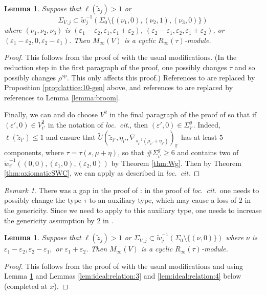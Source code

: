\documentclass[oneside,a4paper,english, 11pt]{amsart}
\theoremstyle{plain}
\theoremstyle{plain}
\theoremstyle{plain}
\newtheorem{lemma}[thm]{Lemma}
\theoremstyle{plain}
\theoremstyle{plain}
\theoremstyle{plain}
\theoremstyle{definition}
\theoremstyle{definition}
\theoremstyle{definition}
\theoremstyle{remark}
\newtheorem{rmk}[thm]{Remark}
\numberwithin{equation}{section}
\newcommand{\F}{\mathbb{F}}
\newcommand{\eps}{\varepsilon}
\newcommand{\speci}{\mathrm{sp}}
\newcommand{\tld}[1]{\widetilde{#1}}
\newcommand{\rhobar}{\overline{\rho}}
\begin{document}
\begin{lemma} \label{lemma:6weight}
Suppose that $\ell(\widetilde{z}_j) > 1$ or 
\[\Sigma_{V,j} \subset \tld{w}_j^{-1} (\Sigma_0 \setminus \{(\nu_1,0),(\nu_2,1),(\nu_3,0)\})\]
where $(\nu_1,\nu_2,\nu_3)$ is $(\eps_1-\eps_2,\eps_1, \eps_1+\eps_2)$, $(\eps_2-\eps_1, \eps_2, \eps_1+\eps_2)$, or $(\eps_1-\eps_2,0,\eps_2-\eps_1)$.
Then $M_\infty(V)$ is a cyclic $R_\infty(\tau)$-module.
\end{lemma}
\begin{proof}
This follows from the proof of \cite[Lemma 5.1.5]{LLLM2} with the usual modifications. 
(In the reduction step in the first paragraph of the proof, one possibly changes $\tau$ and so possibly changes $\rhobar^{\speci}$. This only affects this proof.) 
References to \cite[Theorem 4.1.9]{LLLM2} are replaced by Proposition \ref{prop:lattice:10-gen} above, and references to \cite[Lemma 5.1.4]{LLLM2} are replaced by references to Lemma \ref{lemma:broom}. 

Finally, we can and do choose $V^2$ in the final paragraph of the proof of \cite[Lemma 5.1.5]{LLLM2} so that if $(\eps',0) \in V^2_{i'}$ in the notation of \emph{loc.~cit}., then $(\eps',0) \in \Sigma^g_{i'}$. 
Indeed, $\ell(\tld{z}_{i'}) \leq 1$ and \cite[\S 8]{LLLM} ensure that $\tld{U}(\tld{z}_{i'}, \eta_{i'},\nabla_{s_{i'}^{-1}(\mu_{i'}+\eta_{i'})})_{\F}$ has at least $5$ components, where $\tau = \tau(s,\mu+\eta)$, so that $\# \Sigma^g_{i'} \geq 6$ and contains two of $\tld{w}_{i'}^{-1}((0,0),(\eps_1,0),(\eps_2,0))$ by Theorem \ref{thm:Wg}. 
Then by Theorem \ref{thm:axiomaticSWC}, we can apply \cite[Lemma 10.1.13]{EGS} as described in \emph{loc.~cit}. 
\end{proof}

\begin{rmk} There was a gap in the proof of \cite[Lemma 5.1.5]{LLLM2}: in the proof of \emph{loc.~cit}.~one needs to possibly change the type $\tau$ to an auxiliary type, which may cause a loss of $2$ in the genericity. Since we need to apply \cite[Theorem 4.1.9]{LLLM2} to this auxiliary type, one needs to increase the genericity assumption by $2$ in \cite[Theorem 5.1.1]{LLLM2}.
\end{rmk}
\begin{lemma}\label{lemma:8weight}
Suppose that $\ell(\widetilde{z}_j) > 1$ or $\Sigma_{V,j} \subset \tld{w}_j^{-1} (\Sigma_0 \setminus \{(\nu,0)\})$ where $\nu$ is $\eps_1-\eps_2,\eps_2-\eps_1,$ or $\eps_1+\eps_2$.
Then $M_\infty(V)$ is a cyclic $R_\infty(\tau)$-module.
\end{lemma}
\begin{proof}
This follows from the proof of \cite[Lemma 5.1.6]{LLLM2} with the usual modifications and using Lemma \ref{lemma:6weight} and Lemmas \ref{lem:ideal:relation:3} and \ref{lem:ideal:relation:4} below (completed at $x$). 
\end{proof}
\end{document}
